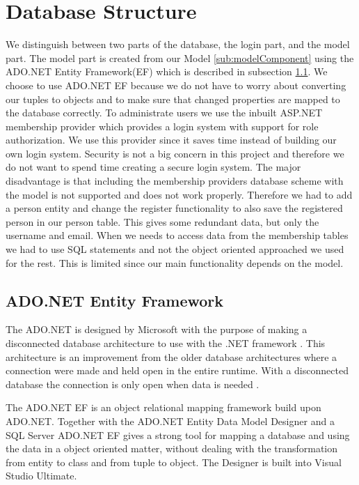 \section{Database Structure}
\label{sec:databasestructure}

We distinguish between two parts of the database, the login part, and the model part. 
The model part is created from our Model \ref{sub:modelComponent} using the ADO.NET Entity Framework(EF) which is described in subsection \ref{sub:adonet}. 
We choose to use ADO.NET EF because we do not have to worry about converting our tuples to objects and to make sure that changed properties are mapped to the database correctly.  
To administrate users we use the inbuilt ASP.NET membership provider which provides a login system with support for role authorization. 
We use this provider since it saves time instead of building our own login system. 
Security is not a big concern in this project and therefore we do not want to spend time creating a secure login system. 
The major disadvantage is that including the membership providers database scheme with the model is not supported and does not work properly. 
Therefore we had to add a person entity and change the register functionality to also save the registered person in our person table. 
This gives some redundant data, but only the username and email. 
When we needs to access data from the membership tables we had to use SQL statements and not the object oriented approached we used for the rest. 
This is limited since our main functionality depends on the model. 

\subsection{ADO.NET Entity Framework}
\label{sub:adonet}
The ADO.NET is designed by Microsoft with the purpose of making a disconnected database architecture to use with the .NET framework \cite{adonetDesignGoal}. 
This architecture is an improvement from the older database architectures where a connection were made and held open in the entire runtime. With a disconnected database the connection is only open when data is needed \cite{disconnectedData}. 

The ADO.NET EF is an object relational mapping framework \cite{adonetEntityFramework} build upon ADO.NET. 
Together with the ADO.NET Entity Data Model Designer and a SQL Server ADO.NET EF gives a strong tool for mapping a database and using the data in a object oriented matter, without dealing with the transformation from entity to class and from tuple to object. 
The Designer is built into Visual Studio Ultimate. 

